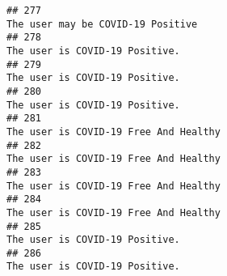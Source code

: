 \documentclass[
]{article}
\begin{document}
\begin{verbatim}
## 277                                                                                                                                                                                                                                  The user may be COVID-19 Positive
## 278                                                                                                                                                                                                                                     The user is COVID-19 Positive.
## 279                                                                                                                                                                                                                                     The user is COVID-19 Positive.
## 280                                                                                                                                                                                                                                     The user is COVID-19 Positive.
## 281                                                                                                                                                                                                                              The user is COVID-19 Free And Healthy
## 282                                                                                                                                                                                                                              The user is COVID-19 Free And Healthy
## 283                                                                                                                                                                                                                              The user is COVID-19 Free And Healthy
## 284                                                                                                                                                                                                                              The user is COVID-19 Free And Healthy
## 285                                                                                                                                                                                                                                     The user is COVID-19 Positive.
## 286                                                                                                                                                                                                                                     The user is COVID-19 Positive.

\end{verbatim}
\end{document}
